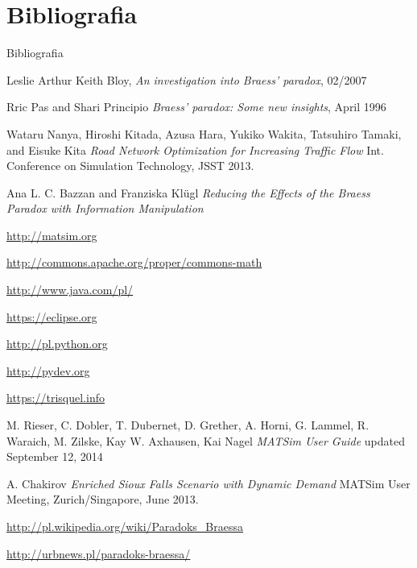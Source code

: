 \documentclass{beamer}
\begin{document}
\section{Bibliografia}
\begin{frame}[allowframebreaks]{Bibliografia}
\begin{thebibliography}{10}

	Leslie Arthur Keith Bloy, 
	\newblock \textit{An investigation into Braess’ paradox}, 02/2007

	Rric Pas and Shari Principio
	\newblock \textit{Braess’ paradox: Some new insights}, April 1996

	Wataru Nanya, Hiroshi Kitada, Azusa Hara, Yukiko Wakita, Tatsuhiro Tamaki, and Eisuke Kita
	\newblock \textit{Road Network Optimization for Increasing Traffic Flow}
	\newblock Int. Conference on Simulation Technology, JSST 2013.

	Ana L. C. Bazzan and Franziska Klügl
	\newblock \textit{Reducing the Effects of the Braess Paradox with Information Manipulation}


\framebreak

	\url{http://matsim.org}	

	\url{http://commons.apache.org/proper/commons-math}

	\url{http://www.java.com/pl/}

	\url{https://eclipse.org}
				
	\url{http://pl.python.org}
	
	\url{http://pydev.org}
	
	\url{https://trisquel.info}
			

\framebreak

	M. Rieser, C. Dobler, T. Dubernet, D. Grether, A. Horni, G. Lammel, R. Waraich, M. Zilske, Kay W. Axhausen, Kai Nagel
	\newblock \textit{MATSim User Guide}
	\newblock updated September 12, 2014

	A. Chakirov
	\newblock \textit{Enriched Sioux Falls Scenario with Dynamic Demand}
	\newblock MATSim User Meeting, Zurich/Singapore, June 2013.
	
	\url{http://pl.wikipedia.org/wiki/Paradoks_Braessa}
	
	\url{http://urbnews.pl/paradoks-braessa/}
	

\end{thebibliography}
\end{frame}
\end{document}
